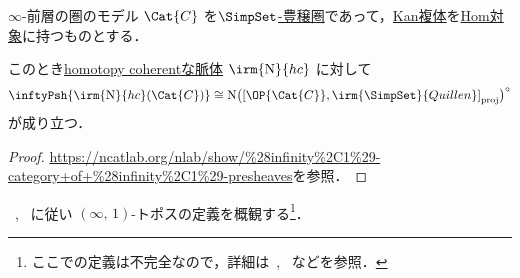 \documentclass[TQFT_main]{subfiles}
\begin{document}
\begin{myprop}[label=prop:nerve-Psh]{$\infty$-前層の圏のモデル}
    $\Cat{C}$ を\hyperref[def:enriched]{$\SimpSet$-豊穣圏}であって，\hyperref[def:KanCplx]{Kan複体}を\hyperref[def:enriched]{Hom対象}に持つものとする．
    
    このとき\hyperref[def:nerve-hc]{homotopy coherentな脈体} $\irm{\mathrm{N}}{hc}$ に対して
    \begin{align}
        \inftyPsh{\irm{\mathrm{N}}{hc}(\Cat{C})} \cong \mathrm{N} \bigl( \comm{\OP{\Cat{C}}}{\irm{\SimpSet}{Quillen}}_{\mathrm{proj}} \bigr)^{\circ}
    \end{align}
    が成り立つ．
\end{myprop}

\begin{proof}
    \url{https://ncatlab.org/nlab/show/%28infinity%2C1%29-category+of+%28infinity%2C1%29-presheaves}を参照．
\end{proof}

~\cite{nLab}, ~\cite[p.9]{NSS2012}に従い $(\infty,\, 1)$-トポスの定義を概観する\footnote{ここでの定義は不完全なので，詳細は~\cite{nLab}, ~\cite{lurie2008higher}などを参照．}．
\end{document}
